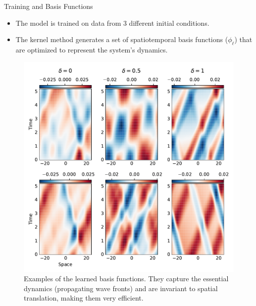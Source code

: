 \documentclass{beamer}
\begin{document}
\begin{frame}{Training and Basis Functions}
    \begin{itemize}
        \item The model is trained on data from 3 different initial conditions.
        \item The kernel method generates a set of spatiotemporal basis functions ($\phi_\ell$) that are optimized to represent the system's dynamics.
    \end{itemize}
    \begin{figure}
        \centering
        \includegraphics[height=0.55\textheight, keepaspectratio]{paper/vsabasis.pdf}
        \caption{Examples of the learned basis functions. They capture the essential dynamics (propagating wave fronts) and are invariant to spatial translation, making them very efficient.}
        \label{fig:vsa-basis}
    \end{figure}
\end{frame}
\end{document}
